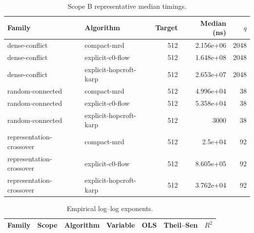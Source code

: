 \begin{table}[t]
\caption{Scope B representative median timings.}
\label{tab:kernel-scope-b}
\begin{tabular}{llrrr}
\toprule
Family & Algorithm & Target & Median (ns) & $q$ \\
\midrule
dense-conflict & compact-mrd & 512 & 2.156e+06 & 2048 \\
dense-conflict & explicit-c0-flow & 512 & 1.648e+08 & 2048 \\
dense-conflict & explicit-hopcroft-karp & 512 & 2.653e+07 & 2048 \\
random-connected & compact-mrd & 512 & 4.996e+04 & 38 \\
random-connected & explicit-c0-flow & 512 & 5.358e+04 & 38 \\
random-connected & explicit-hopcroft-karp & 512 & 3000 & 38 \\
representation-crossover & compact-mrd & 512 & 2.5e+04 & 92 \\
representation-crossover & explicit-c0-flow & 512 & 8.605e+05 & 92 \\
representation-crossover & explicit-hopcroft-karp & 512 & 3.762e+04 & 92 \\
\bottomrule
\end{tabular}
\end{table}

\begin{table}[t]
\caption{Empirical log--log exponents.}
\label{tab:kernel-exponents}
\begin{tabular}{llllrrr}
\toprule
Family & Scope & Algorithm & Variable & OLS & Theil--Sen & $R^2$ \\
\midrule
\bottomrule
\end{tabular}
\end{table}

